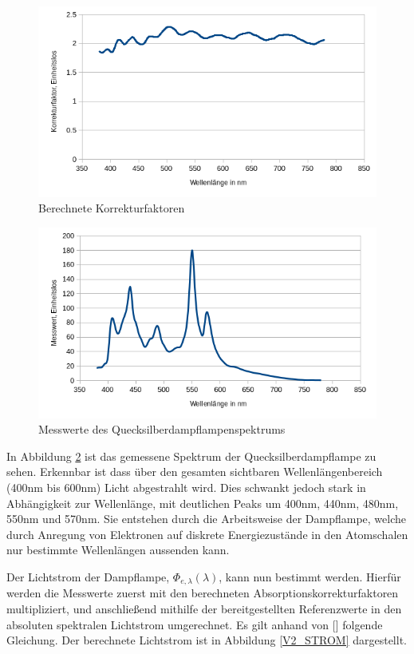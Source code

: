 \begin{figure}[h]
	\centering
	\includegraphics[scale=0.7]{Images/V2_Korr.png}
	\caption{Berechnete Korrekturfaktoren}
	\label{V2_KOR}
\end{figure}

\begin{figure}[h]
	\centering
	\includegraphics[scale=0.7]{Images/V2_Dampflampe.png}
	\caption{Messwerte des Quecksilberdampflampenspektrums}
	\label{V2_QDL}
\end{figure}

In Abbildung \ref{V2_QDL} ist das gemessene Spektrum der Quecksilberdampflampe zu sehen. Erkennbar ist dass über den gesamten sichtbaren Wellenlängenbereich (400nm bis 600nm) Licht abgestrahlt wird. Dies schwankt jedoch stark in Abhängigkeit zur Wellenlänge, mit deutlichen Peaks um 400nm, 440nm, 480nm, 550nm und 570nm. Sie entstehen durch die Arbeitsweise der Dampflampe, welche durch Anregung von Elektronen auf diskrete Energiezustände in den Atomschalen nur bestimmte Wellenlängen aussenden kann.

Der Lichtstrom der Dampflampe, $\Phi_{e,\lambda}(\lambda)$, kann nun bestimmt werden. Hierfür werden die Messwerte zuerst mit den berechneten Absorptionskorrekturfaktoren multipliziert, und anschließend mithilfe der bereitgestellten Referenzwerte in den absoluten spektralen Lichtstrom umgerechnet. Es gilt anhand von [\cite[Seite 22]{AML_SKRIPT}] folgende Gleichung. Der berechnete Lichtstrom ist in Abbildung \ref{V2_STROM} dargestellt.

